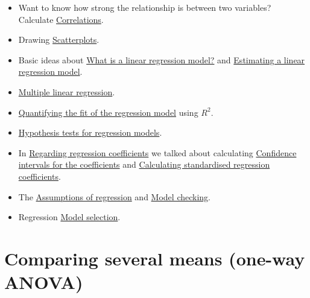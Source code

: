 \documentclass[
  a4paper,
]{book}
\providecommand{\tightlist}{%
  \setlength{\itemsep}{0pt}\setlength{\parskip}{0pt}}\usepackage{longtable,booktabs,array}
\begin{document}
\begin{itemize}
\tightlist
\item
  Want to know how strong the relationship is between two variables?
  Calculate \protect\hyperlink{correlations}{Correlations}.
\item
  Drawing \protect\hyperlink{scatterplots}{Scatterplots}.
\item
  Basic ideas about
  \protect\hyperlink{what-is-a-linear-regression-model}{What is a linear
  regression model?} and
  \protect\hyperlink{estimating-a-linear-regression-model}{Estimating a
  linear regression model}.
\item
  \protect\hyperlink{multiple-linear-regression}{Multiple linear
  regression}.
\item
  \protect\hyperlink{quantifying-the-fit-of-the-regression-model}{Quantifying
  the fit of the regression model} using \(R^2\).
\item
  \protect\hyperlink{hypothesis-tests-for-regression-models}{Hypothesis
  tests for regression models}.
\item
  In \protect\hyperlink{regarding-regression-coefficients}{Regarding
  regression coefficients} we talked about calculating
  \protect\hyperlink{confidence-intervals-for-the-coefficients}{Confidence
  intervals for the coefficients} and
  \protect\hyperlink{calculating-standardised-regression-coefficients}{Calculating
  standardised regression coefficients}.
\item
  The \protect\hyperlink{assumptions-of-regression}{Assumptions of
  regression} and \protect\hyperlink{sec-Model-checking}{Model
  checking}.
\item
  Regression \protect\hyperlink{model-selection}{Model selection}.
\end{itemize}


\hypertarget{sec-Comparing-several-means-one-way-ANOVA}{%
\chapter{Comparing several means (one-way
ANOVA)}\label{sec-Comparing-several-means-one-way-ANOVA}}
\end{document}
